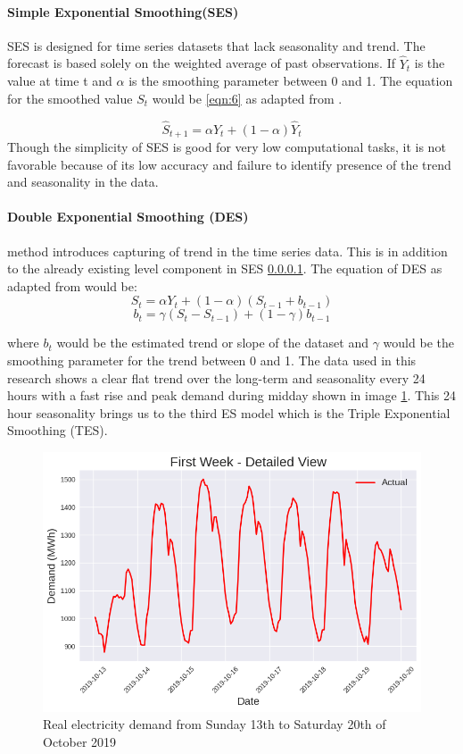 \paragraph{Simple Exponential Smoothing(SES)}\label{par:ses}
SES is designed for time series datasets that lack seasonality and trend. The forecast is based solely on the weighted average of past observations. If $\hat{Y}_{t}$  is the value at time t  and $\alpha$ is the smoothing parameter between 0 and 1. The equation for the smoothed value $S_{t}$ would be \ref{eqn:6} as adapted from \cite{ostertagova2011simple}.

\[
\hat{S}_{t+1}  = \alpha Y_t + (1-\alpha)\hat{Y}_t
\tag{11}
\label{eqn:6}
\]
 Though the simplicity of SES is good for very low computational tasks, it is not favorable because of its low accuracy and failure to identify presence of the trend and seasonality in the data.
 
 \paragraph{Double Exponential Smoothing (DES)} method introduces capturing of trend in the time series data. This is in addition to the already existing level component in SES \ref{par:ses}. The equation of DES as adapted from \cite{nist_double_exp_smoothing} would be:
 \[
  S_t = \alpha Y_t + (1-\alpha)(S_{t-1} + b_{t-1})
  \tag{12}
 \label{eqn:7}
 \] 
 \[
  b_t = \gamma (S_t - S_{t-1}) + (1-\gamma) b_{t-1}
  \tag{13}
 \label{eqn:8}
 \]
 
 where $b_t$ would be the estimated trend or slope of the dataset and $\gamma$ would be the smoothing parameter for the trend  between 0 and 1. The data used in this research shows a clear flat trend over the long-term and seasonality every 24 hours with a fast rise and peak demand during midday shown in image \ref{fig:weeklydemand}. This 24 hour seasonality brings us to the third ES model which is the Triple Exponential Smoothing (TES). 
 \begin{figure}[h]
 	\centering
 	\includegraphics[width=0.7\linewidth]{Chapters/images/weekly_demand}
 	\caption{Real electricity demand from Sunday 13th to Saturday 20th of October 2019}
 	\label{fig:weeklydemand}
 \end{figure}
 
